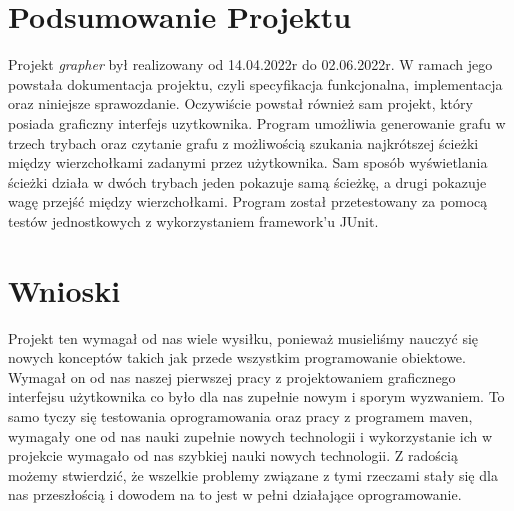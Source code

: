\documentclass[10pt, a4paper]{report}
\begin{document}
\section{Podsumowanie Projektu}\label{sec:podsumowanie-projektu}
Projekt \textit{grapher} był realizowany od 14.04.2022r do 02.06.2022r. W ramach jego powstała dokumentacja projektu, czyli
specyfikacja funkcjonalna, implementacja oraz niniejsze sprawozdanie. Oczywiście powstał również sam projekt, który posiada graficzny interfejs uzytkownika.
Program umożliwia generowanie grafu w trzech trybach oraz czytanie grafu z możliwością szukania najkrótszej ścieżki między wierzchołkami zadanymi przez użytkownika.
Sam sposób wyświetlania ścieżki działa w dwóch trybach jeden pokazuje samą ścieżkę, a drugi pokazuje wagę przejść między wierzchołkami. Program został przetestowany za pomocą testów
jednostkowych z wykorzystaniem framework'u JUnit.

\section{Wnioski}\label{sec:wnioski}
Projekt ten wymagał od nas wiele wysiłku, ponieważ musieliśmy nauczyć się nowych konceptów takich jak przede wszystkim
programowanie obiektowe. Wymagał on od nas naszej pierwszej pracy z projektowaniem graficznego interfejsu użytkownika co było dla nas zupełnie nowym i sporym wyzwaniem.
To samo tyczy się testowania oprogramowania oraz pracy z programem maven, wymagały one od nas nauki zupełnie nowych technologii i wykorzystanie ich w projekcie wymagało od nas
szybkiej nauki nowych technologii. Z radością możemy stwierdzić, że wszelkie problemy związane z tymi rzeczami stały się dla nas przeszłością i dowodem na to jest w pełni działające
oprogramowanie.
\end{document}
